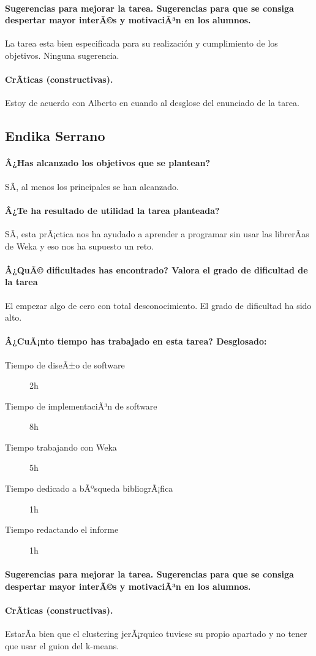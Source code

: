 \documentclass[11pt, titlepage,a4paper]{article}
\begin{document}
\paragraph{Sugerencias para mejorar la tarea. Sugerencias para que se consiga despertar mayor
interÃ©s y motivaciÃ³n en los alumnos.\\}
La tarea esta bien especificada para su realización y cumplimiento de los
objetivos. Ninguna sugerencia.

\paragraph{CrÃ­ticas (constructivas).\\}
Estoy de acuerdo con Alberto en cuando al desglose del enunciado de la tarea.

\subsection{Endika Serrano}
\paragraph{Â¿Has alcanzado los objetivos que se plantean?\\}
SÃ­, al menos los principales se han alcanzado.
\paragraph{Â¿Te ha resultado de utilidad la tarea planteada?\\}
SÃ­, esta prÃ¡ctica nos ha ayudado a aprender a programar sin usar las librerÃ­as de Weka y eso nos ha supuesto un reto.
 \paragraph{Â¿QuÃ© dificultades has encontrado? Valora el grado de dificultad de
la tarea\\}
El empezar algo de cero con total desconocimiento. El grado de dificultad ha
sido alto.
\paragraph{Â¿CuÃ¡nto tiempo has trabajado en esta tarea? Desglosado:\\}
\begin{description}
	\item[Tiempo de diseÃ±o de software] 2h
	\item[Tiempo de implementaciÃ³n de software] 8h
	\item[Tiempo trabajando con Weka] 5h
	\item[Tiempo dedicado a bÃºsqueda bibliogrÃ¡fica] 1h
	\item[Tiempo redactando el informe] 1h
\end{description}

\paragraph{Sugerencias para mejorar la tarea. Sugerencias para que se consiga despertar mayor
interÃ©s y motivaciÃ³n en los alumnos.\\}

\paragraph{CrÃ­ticas (constructivas).\\}
EstarÃ­a bien que el clustering jerÃ¡rquico tuviese su propio apartado y no tener
que usar el guion del k-means.
\end{document}
